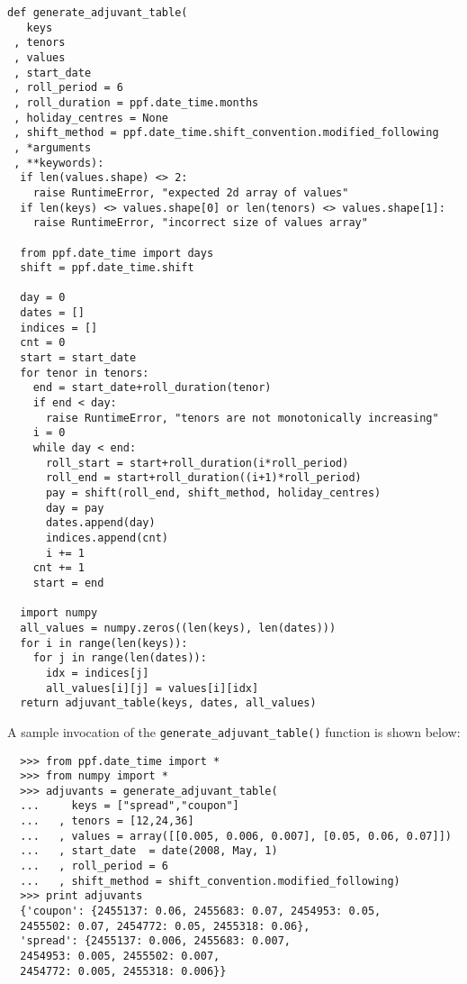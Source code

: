 \begin{verbatim}
def generate_adjuvant_table(
   keys
 , tenors
 , values
 , start_date
 , roll_period = 6
 , roll_duration = ppf.date_time.months
 , holiday_centres = None
 , shift_method = ppf.date_time.shift_convention.modified_following
 , *arguments
 , **keywords):
  if len(values.shape) <> 2:
    raise RuntimeError, "expected 2d array of values"
  if len(keys) <> values.shape[0] or len(tenors) <> values.shape[1]:
    raise RuntimeError, "incorrect size of values array"

  from ppf.date_time import days
  shift = ppf.date_time.shift

  day = 0
  dates = []
  indices = []
  cnt = 0
  start = start_date
  for tenor in tenors:
    end = start_date+roll_duration(tenor)
    if end < day:
      raise RuntimeError, "tenors are not monotonically increasing"
    i = 0    
    while day < end:
      roll_start = start+roll_duration(i*roll_period)
      roll_end = start+roll_duration((i+1)*roll_period)
      pay = shift(roll_end, shift_method, holiday_centres)
      day = pay
      dates.append(day)
      indices.append(cnt)
      i += 1
    cnt += 1
    start = end
    
  import numpy
  all_values = numpy.zeros((len(keys), len(dates)))
  for i in range(len(keys)):
    for j in range(len(dates)):
      idx = indices[j]
      all_values[i][j] = values[i][idx]
  return adjuvant_table(keys, dates, all_values)
\end{verbatim}
A sample invocation of the \verb|generate_adjuvant_table()| function is
shown below:
\begin{verbatim}
  >>> from ppf.date_time import *
  >>> from numpy import *
  >>> adjuvants = generate_adjuvant_table(
  ...     keys = ["spread","coupon"]
  ...   , tenors = [12,24,36]
  ...   , values = array([[0.005, 0.006, 0.007], [0.05, 0.06, 0.07]])
  ...   , start_date  = date(2008, May, 1)
  ...   , roll_period = 6
  ...   , shift_method = shift_convention.modified_following)
  >>> print adjuvants
  {'coupon': {2455137: 0.06, 2455683: 0.07, 2454953: 0.05, 
  2455502: 0.07, 2454772: 0.05, 2455318: 0.06}, 
  'spread': {2455137: 0.006, 2455683: 0.007, 
  2454953: 0.005, 2455502: 0.007, 
  2454772: 0.005, 2455318: 0.006}}
\end{verbatim}


